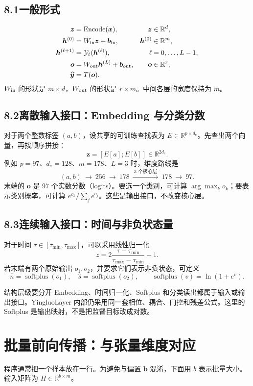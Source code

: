 \documentclass[UTF8,11pt,a4paper,fontset=fandol]{ctexart}
\newcommand{\R}{\mathbb R}
\newcommand{\spplus}{\operatorname{softplus}}
\newcommand{\YLayer}{\mathcal{Y}}
\newcommand{\newsection}[1]{\clearpage\section{#1}}
\begin{document}
\subsection*{8.1\quad 一般形式}
\begin{align}
\boldsymbol{z}&=\operatorname{Encode}(\boldsymbol{x}),&\boldsymbol{z}&\in\R^d,\notag\\
\boldsymbol{h}^{(0)}&=W_{\rm in}\boldsymbol{z}+\boldsymbol{b}_{\rm in},&\boldsymbol{h}^{(0)}&\in\R^m,\notag\\
\boldsymbol{h}^{(\ell+1)}&=\YLayer_\ell(\boldsymbol{h}^{(\ell)}),&\ell&=0,\ldots,L-1,\notag\\
\boldsymbol{o}&=W_{\rm out}\boldsymbol{h}^{(L)}+\boldsymbol{b}_{\rm out},&\boldsymbol{o}&\in\R^r,\notag\\
\widehat{\boldsymbol{y}}&=T(\boldsymbol{o}).&&\label{eq:whole}
\end{align}
$W_{\rm in}$ 的形状是 $m\times d$，$W_{\rm out}$ 的形状是 $r\times m$。中间各层的宽度保持为 $m$。
\subsection*{8.2\quad 离散输入接口：Embedding 与分类分数}
对于两个整数标签 $(a,b)$，设共享的可训练查找表为 $E\in\R^{p\times d_e}$。先查出两个向量，再按顺序拼接：
\[
\boldsymbol{z}=[E[a];E[b]]\in\R^{2d_e}.
\]
例如 $p=97$、$d_e=128$、$m=178$、$L=3$ 时，维度路线是
\[
(a,b)\ \longrightarrow\ 256\ \longrightarrow\ 178
\ \xrightarrow{\ 3\text{ 个核心层}\ }\ 178\ \longrightarrow\ 97.
\]
末端的 $\boldsymbol{o}$ 是 97 个实数分数（logits）。要选一个类别，可计算 $\arg\max_k o_k$；要表示类别概率，可计算 $e^{o_k}/\sum_j e^{o_j}$。这些是输出接口，不改变核心层。
\subsection*{8.3\quad 连续输入接口：时间与非负状态量}
对于时间 $\tau\in[\tau_{\min},\tau_{\max}]$，可以采用线性归一化
\[
 z=2\frac{\tau-\tau_{\min}}{\tau_{\max}-\tau_{\min}}-1.
\]
若末端有两个原始输出 $o_1,o_2$，并要求它们表示非负状态，可定义
\[
\widehat n=\spplus(o_1),\quad \widehat s=\spplus(o_2),\qquad
\spplus(v)=\ln(1+e^v).
\]
\begin{notebox}{结构层级要分开}
Embedding、时间归一化、Softplus 和分类读出都属于输入或输出接口。YingluoLayer 内部仍采用同一套相位、耦合、门控和残差公式。这里的 Softplus 是输出映射，不是把监督目标改成对数。
\end{notebox}

\newsection{批量前向传播：与张量维度对应}
程序通常把一个样本放在一行。为避免与偏置 $\boldsymbol{b}$ 混淆，下面用 $b$ 表示批量大小。输入矩阵为 $H\in\R^{b\times m}$。
\end{document}
